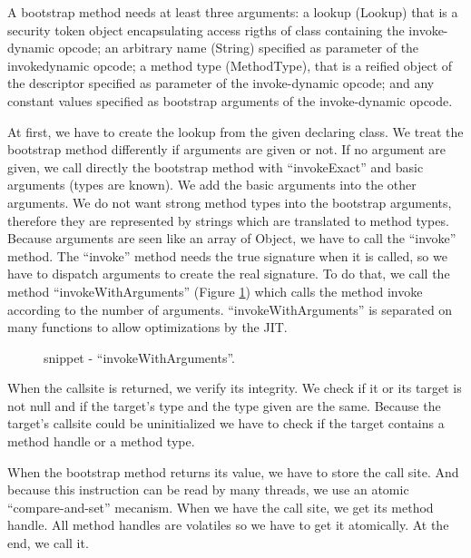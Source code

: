 \documentclass{sig-alternate}
\begin{document}
      A bootstrap method needs at least three arguments:
      a lookup (Lookup) that is a security token object encapsulating access rigths of class containing the invoke-dynamic opcode;
      an arbitrary name (String) specified as parameter of the invokedynamic opcode;
      a method type (MethodType), that is a reified object of the descriptor specified as parameter of the invoke-dynamic opcode;
      and any constant values specified as bootstrap arguments of the invoke-dynamic opcode.

      At first, we have to create the lookup from the given  declaring class.
      We treat the bootstrap method differently if arguments are given or not.
      If no argument are given, we call directly the bootstrap method
      with ``invokeExact'' and basic arguments (types are known).
      We add the basic arguments into the other arguments.
      We do not want strong method types into the bootstrap arguments,
      therefore they are represented by strings which are translated to method types.
      Because arguments are seen like an array of Object,
      we have to call the ``invoke'' method.
      The ``invoke'' method needs the true signature when it is called,
      so we have to dispatch arguments to create the real signature.
      To do that, we call the method ``invokeWithArguments'' (Figure \ref{implIWA})
      which calls the method invoke according to the number of arguments.
      ``invokeWithArguments'' is separated on many functions to allow optimizations by the JIT.

      \begin{figure}[!h]
        \centering \vspace{-1.5em}
        \caption{snippet - ``invokeWithArguments''.}
        \label{implIWA}
      \end{figure}

      When the callsite is returned, we verify its integrity.
      We check if it or its target is not null and if the target's type and the type given are the same.
      Because the target's callsite could be uninitialized we have to check if the target contains a method handle or a method type.

      When the bootstrap method returns its value, we have to store the call site.
      And because this instruction can be read by many threads, we use an atomic ``compare-and-set'' mecanism.
      When we have the call site, we get its method handle.
      All method handles are volatiles so we have to get it atomically.
      At the end, we call it.
\end{document}
